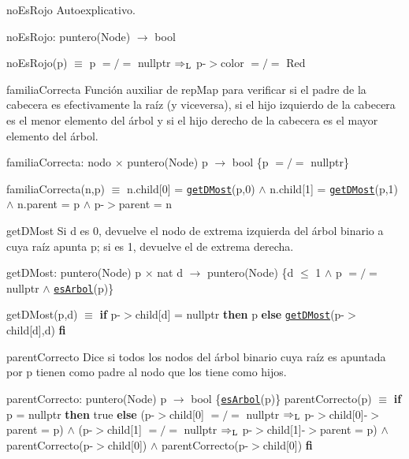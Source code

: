 \begin{DoxyParagraph}{no\-Es\-Rojo}
Autoexplicativo.

no\-Es\-Rojo\-: puntero(\-Node) $\to$ bool \par
no\-Es\-Rojo(p) $\equiv$ p $=/=$ nullptr $\Rightarrow_{\rm L}$ p-\/$>$color $=/=$ Red


\end{DoxyParagraph}
\begin{DoxyParagraph}{familia\-Correcta}
Función auxiliar de rep\-Map para verificar si el padre de la cabecera es efectivamente la raíz (y viceversa), si el hijo izquierdo de la cabecera es el menor elemento del árbol y si el hijo derecho de la cabecera es el mayor elemento del árbol.

familia\-Correcta\-: nodo $\times$ puntero(\-Node) p $\to$ bool \{p $=/=$ nullptr\} \par
familia\-Correcta(n,p) $\equiv$ n.\-child\mbox{[}0\mbox{]} = \href{axiomas.html#getDMost}{\tt get\-D\-Most}(p,0) $\land$ n.\-child\mbox{[}1\mbox{]} = \href{axiomas.html#getDMost}{\tt get\-D\-Most}(p,1) $\land$ n.\-parent = p $\land$ p-\/$>$parent = n


\end{DoxyParagraph}
\begin{DoxyParagraph}{get\-D\-Most}
Si d es 0, devuelve el nodo de extrema izquierda del árbol binario a cuya raíz apunta p; si es 1, devuelve el de extrema derecha.

get\-D\-Most\-: puntero(\-Node) p $\times$ nat d $\to$ puntero(\-Node) \{d $\leq$ 1 $\land$ p $=/=$ nullptr $\land$ \href{axiomas.html#esArbol}{\tt es\-Arbol}(p)\} \par
get\-D\-Most(p,d) $\equiv$ {\bfseries if} p-\/$>$child\mbox{[}d\mbox{]} = nullptr {\bfseries then} p {\bfseries else} \href{axiomas.html#getDMost}{\tt get\-D\-Most}(p-\/$>$child\mbox{[}d\mbox{]},d) {\bfseries fi} 


\end{DoxyParagraph}
\begin{DoxyParagraph}{parent\-Correcto}
Dice si todos los nodos del árbol binario cuya raíz es apuntada por p tienen como padre al nodo que los tiene como hijos.

parent\-Correcto\-: puntero(\-Node) p $\to$ bool \{\href{axiomas.html#esArbol}{\tt es\-Arbol}(p)\} parent\-Correcto(p) $\equiv$ {\bfseries if} p = nullptr {\bfseries then} true {\bfseries else} (p-\/$>$child\mbox{[}0\mbox{]} $=/=$ nullptr $\Rightarrow_{\rm L}$ p-\/$>$child\mbox{[}0\mbox{]}-\/$>$parent = p) $\land$ (p-\/$>$child\mbox{[}1\mbox{]} $=/=$ nullptr $\Rightarrow_{\rm L}$ p-\/$>$child\mbox{[}1\mbox{]}-\/$>$parent = p) $\land$ parent\-Correcto(p-\/$>$child\mbox{[}0\mbox{]}) $\land$ parent\-Correcto(p-\/$>$child\mbox{[}0\mbox{]}) {\bfseries fi} 


\end{DoxyParagraph}
